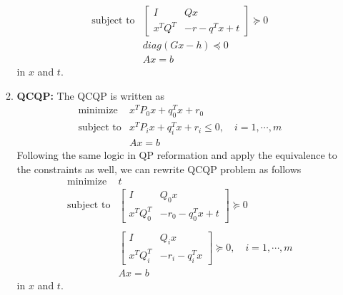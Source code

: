 \documentclass[12pt] {article}
\begin{document}
\begin{enumerate}
\begin{enumerate}
\[\begin{array}{cl}
\text{subject to} & \left[ \begin{array}{cc}
                     I & Qx \\
                     x^{T}Q^{T} & -r-q^{T}x + t
                     \end{array} \right] \succeq 0 \\
                   & diag(Gx - h) \preceq 0 \\
&Ax = b
\end{array} 
\]
in $x$ and $t$.
\item \textbf{QCQP:} The QCQP is written as 
\[
\begin{array}{cl}
\text{minimize} & x^{T}P_{0}x+q_{0}^{T}x+r_{0}\\
\text{subject to} & x^{T}P_{i}x+q_{i}^{T}x+r_{i} \leq 0, \quad i=1,\cdots,m\\
&Ax = b
\end{array} 
\]
Following the same logic in QP reformation and apply the equivalence to the constraints as well, we can rewrite QCQP problem as follows 
\[
\begin{array}{cl}
\text{minimize} & t\\

\text{subject to} & \left[ \begin{array}{cc}
                     I & Q_{0}x \\
                     x^{T}Q_{0}^{T} & -r_{0}-q_{0}^{T}x + t
                     \end{array} \right] \succeq 0 \\
                     \\
                  &  \left[ \begin{array}{cc}
                     I & Q_{i}x \\
                     x^{T}Q_{i}^{T} & -r_{i}-q_{i}^{T}x
                     \end{array} \right] \succeq 0, \quad i=1,\cdots, m \\
                  &Ax = b
\end{array} 
\]
in $x$ and $t$.
 

\end{enumerate}
\end{enumerate}
\end{document}

